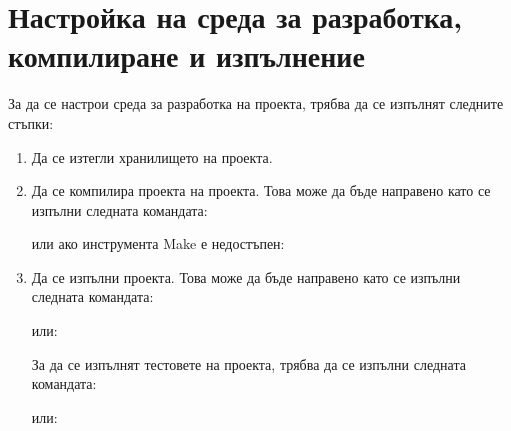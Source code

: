 \section{Настройка на среда за разработка, компилиране и изпълнение}
За да се настрои среда за разработка на проекта, трябва да се изпълнят следните стъпки:
\begin{enumerate}
    \item Да се изтегли хранилището на проекта.
    

    \item Да се компилира проекта на проекта. Това може да бъде направено като се изпълни следната командата:
    
    или ако инструмента Make е недостъпен:
    

    \item Да се изпълни проекта. Това може да бъде направено като се изпълни следната командата:
    
    или:
    

    За да се изпълнят тестовете на проекта, трябва да се изпълни следната командата:
    
    или:
    
\end{enumerate}